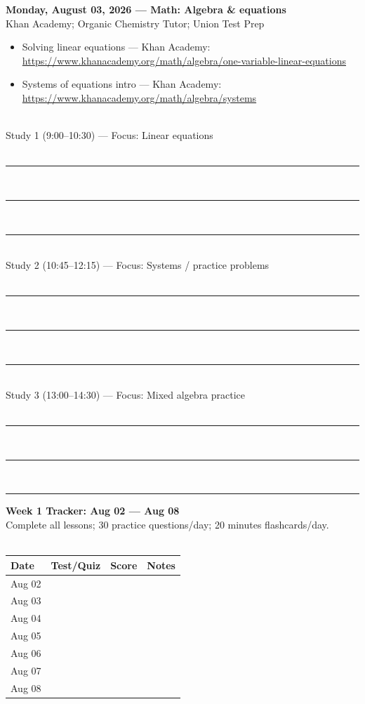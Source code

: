 \documentclass[11pt,a4paper]{article}
\begin{document}
{\large \textbf{Monday, August 03, 2026 — Math: Algebra & equations}}\\[6pt]
 Khan Academy; Organic Chemistry Tutor; Union Test Prep\\[6pt]
\begin{itemize}
  \item Solving linear equations — Khan Academy: \url{https://www.khanacademy.org/math/algebra/one-variable-linear-equations}
  \item Systems of equations intro — Khan Academy: \url{https://www.khanacademy.org/math/algebra/systems}
\end{itemize}
\vspace{4mm}
\\
Study 1 (9:00–10:30) — Focus: Linear equations\\
\vspace{2mm}
\\[2pt]
\rule{\linewidth}{0.5pt}\\[2pt]
\rule{\linewidth}{0.5pt}\\[2pt]
\rule{\linewidth}{0.5pt}\\[6pt]
Study 2 (10:45–12:15) — Focus: Systems / practice problems\\
\vspace{2mm}
\\[2pt]
\rule{\linewidth}{0.5pt}\\[2pt]
\rule{\linewidth}{0.5pt}\\[2pt]
\rule{\linewidth}{0.5pt}\\[6pt]
Study 3 (13:00–14:30) — Focus: Mixed algebra practice\\
\vspace{2mm}
\\[2pt]
\rule{\linewidth}{0.5pt}\\[2pt]
\rule{\linewidth}{0.5pt}\\[2pt]
\rule{\linewidth}{0.5pt}
\newpage

{\large \textbf{Week 1 Tracker: Aug 02 — Aug 08}}\\[6pt]
 Complete all lessons; 30 practice questions/day; 20 minutes flashcards/day.\\[6pt]
\\
\begin{tabular}{|p{40mm}|p{25mm}|p{25mm}|p{25mm}|}
\hline
Date & Test/Quiz & Score & Notes \\
\hline
Aug 02 & & & \\
\hline
Aug 03 & & & \\
\hline
Aug 04 & & & \\
\hline
Aug 05 & & & \\
\hline
Aug 06 & & & \\
\hline
Aug 07 & & & \\
\hline
Aug 08 & & & \\
\hline
\end{tabular}
\end{document}
